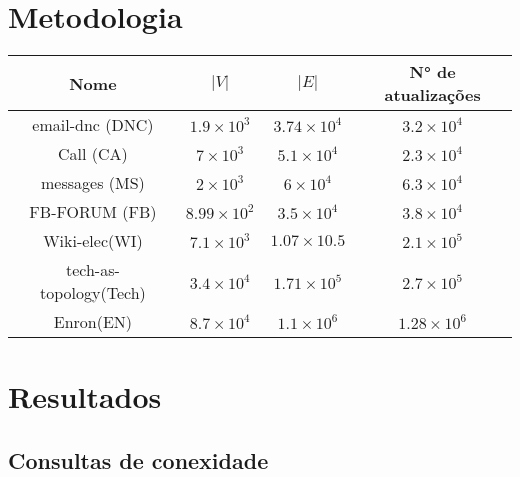 \section{Metodologia}
\begin{center}
\begin{tabular}{ |c|c|c|c| } 
 \hline
	Nome & $|V|$ & $|E|$ & N° de atualizações\\
 \hline
	email-dnc (DNC)\cite{nr-aaai15}&$1.9\times 10^3$&$3.74\times 10^4$&$3.2\times 10^4$\\
 \hline
	Call (CA)\cite{nr-aaai15}&$7\times 10^3$&$5.1\times 10^4$&$2.3\times 10^4$\\
 \hline
	messages (MS)\cite{nr-aaai15}&$2\times 10^3$&$6\times 10^4$&$6.3\times 10^4$\\
 \hline
	FB-FORUM (FB)\cite{nr-aaai15}&$8.99\times 10^2$&$3.5\times 10^4$&$3.8\times 10^4$\\
 \hline
	Wiki-elec(WI)\cite{nr-aaai15}&$7.1\times 10^3$&$1.07\times 10.5$&$2.1\times 10^5$\\
 \hline
	tech-as-topology(Tech)\cite{nr-aaai15}&$3.4\times 10^4$&$1.71\times 10^5$&$2.7\times 10^5$\\
 \hline
	Enron(EN)\cite{nr-aaai15}&$8.7\times 10^4$&$1.1\times 10^6$&$1.28\times 10^6$\\
 \hline
\end{tabular}
\end{center}


\section{Resultados}
\subsection{Consultas de conexidade}
\legenda
{}


